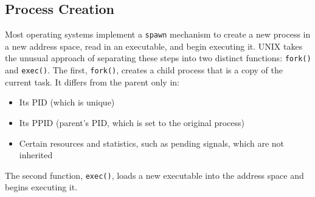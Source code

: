 \subsection{Process Creation}\label{subsec:Process_Creation}
Most operating systems implement a \texttt{spawn} mechanism to create a new process in a new address space, read in an executable, and begin executing it.
UNIX takes the unusual approach of separating these steps into two distinct functions: \texttt{fork()} and \texttt{exec()}.
The first, \texttt{fork()}, creates a child process that is a copy of the current task.
It differs from the parent only in:
\begin{itemize}[noitemsep]
\item Its PID (which is unique)
\item Its PPID (parent’s PID, which is set to the original process)
\item Certain resources and statistics, such as pending signals, which are not inherited
\end{itemize}

The second function, \texttt{exec()}, loads a new executable into the address space and begins executing it.


